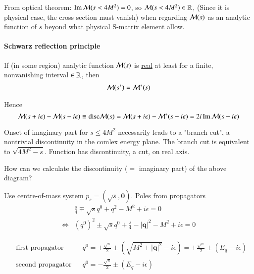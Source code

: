 From optical theorem: $\Im \mathcal{M}(s < 4M^2) = 0$, so $\mathcal{M}(s < 4M^2) \in \mathbb{R}$, (Since it is physical case, the cross section must vanish) when regarding $\mathcal{M}(s)$ as an analytic function of $s$ beyond what physical S-matrix element allow.

\paragraph{Schwarz reflection principle}
If (in some region) analytic function $\mathcal{M}(s)$ is \underline{real} at least for a finite, nonvanishing interval $\in \mathbb{R}$, then
\begin{align}
	\mathcal{M}(s^*) = \mathcal{M}^* (s)
\end{align}

Hence 
$$\mathcal{M}(s+i\epsilon)-\mathcal{M}(s-i\epsilon) \equiv \text{disc} \mathcal{M}(s) = \mathcal{M}(s + i\epsilon) - \mathcal{M}^*(s+i\epsilon) = 2i \Im \mathcal{M}(s+i\epsilon)$$
\begin{center}
\end{center}

Onset of imaginary part for $s \leq 4M^2$ necessarily leads to a "branch cut", a nontrivial discontinuity in the comlex energy plane. The branch cut is equivalent to $\sqrt{4M^2 - s}$. Function has discontinuity, a cut, on real axis.

How can we calculate the discontinuity ($=$ imaginary part) of the above diagram?

Use centre-of-mass system $p_s = (\sqrt{s}, \pmb{0})$. Poles from propagators 
\begin{align*}
	& \frac{s}{4} \mp \sqrt{s}q^0 + q^2 - M^2 + i\epsilon = 0  \\
	\Leftrightarrow &(q^0)^2 \pm \sqrt{s} q^0 + \frac{s}{4} - |\pmb{q}|^2 -M^2 + i\epsilon = 0
\end{align*}

\begin{align*}
	& \text{first propagator} && q^0 = + \frac{\sqrt{s}}{2} \pm (\sqrt{M^2 + |\pmb{q}|^2} - i\epsilon) = +\frac{\sqrt{s}}{2} \pm (E_q - i\epsilon) \\
	& \text{second propagator} && q^0 = -\frac{\sqrt{s}}{2} \pm (E_q - i\epsilon)
\end{align*}

